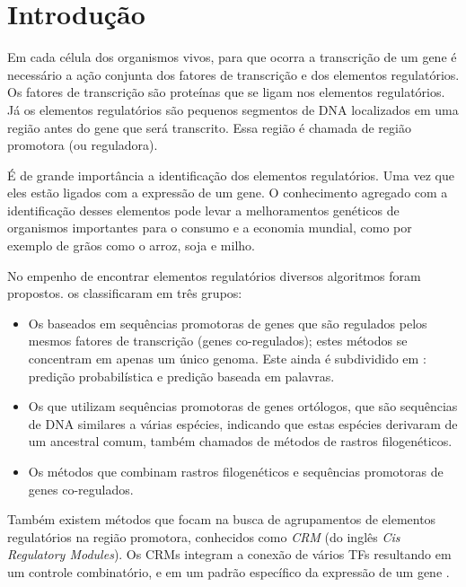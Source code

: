 \chapter{Introdução}

Em cada célula dos organismos vivos, para que ocorra a transcrição de um gene é necessário a ação conjunta dos fatores de transcrição e dos elementos regulatórios. Os fatores de transcrição são proteínas que se ligam nos elementos regulatórios. Já os elementos regulatórios são pequenos segmentos de DNA localizados em uma região antes do gene que será transcrito. Essa região é chamada de região promotora (ou reguladora).

É de grande importância a identificação dos elementos regulatórios. Uma vez que eles estão ligados com a expressão de um gene. O conhecimento agregado com a identificação desses elementos pode levar a melhoramentos genéticos de organismos importantes para o consumo e a economia mundial, como por exemplo de grãos como o arroz, soja e milho.

No empenho de encontrar elementos regulatórios diversos algoritmos foram propostos. \cite{Das2007} os classificaram em três grupos:

\begin{itemize}
	\item Os baseados em sequências promotoras de genes que são regulados pelos mesmos fatores de transcrição (genes co-regulados); estes métodos se concentram em apenas um único genoma.
	\subitem Este ainda é subdividido em : predição probabilística e predição baseada em palavras.
	
	\item Os que utilizam sequências promotoras de genes ortólogos, que são sequências de DNA similares a várias espécies, indicando que estas espécies derivaram de um ancestral comum, também chamados de métodos de rastros filogenéticos.
	
	\item Os métodos que combinam rastros filogenéticos e sequências promotoras de genes co-regulados.
\end{itemize}

Também existem métodos que focam na busca de agrupamentos de elementos regulatórios na região promotora, conhecidos como \textit{CRM} (do inglês \textit{Cis Regulatory Modules}). Os CRMs integram a conexão de vários TFs resultando em um controle combinatório, e em um padrão específico da expressão de um gene \cite{Priest2009}.

